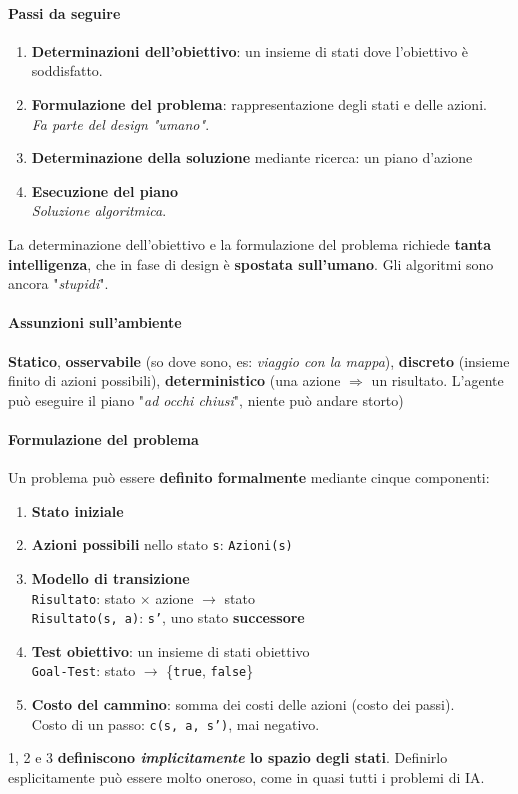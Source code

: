 \documentclass[10pt]{book}
\begin{document}
\paragraph{Passi da seguire}
\begin{enumerate}
	\item \textbf{Determinazioni dell'obiettivo}: un insieme di stati dove l'obiettivo è soddisfatto.
	\item \textbf{Formulazione del problema}: rappresentazione degli stati e delle azioni.\\
	\textit{Fa parte del design "umano"}.
	\item \textbf{Determinazione della soluzione} mediante ricerca: un piano d'azione
	\item \textbf{Esecuzione del piano}\\
	\textit{Soluzione algoritmica}.
\end{enumerate}
La determinazione dell'obiettivo e la formulazione del problema richiede \textbf{tanta intelligenza}, che in fase di design è \textbf{spostata sull'umano}. Gli algoritmi sono ancora "\textit{stupidi}".
\paragraph{Assunzioni sull'ambiente} \textbf{Statico}, \textbf{osservabile} (so dove sono, es: \textit{viaggio con la mappa}), \textbf{discreto} (insieme finito di azioni possibili), \textbf{deterministico} (una azione $\Rightarrow$ un risultato. L'agente può eseguire il piano "\textit{ad occhi chiusi}", niente può andare storto)
\paragraph{Formulazione del problema} Un problema può essere \textbf{definito formalmente} mediante cinque componenti:
\begin{enumerate}
	\item \textbf{Stato iniziale}
	\item \textbf{Azioni possibili} nello stato \texttt{s}: \texttt{Azioni(s)}
	\item \textbf{Modello di transizione}\\
	\texttt{Risultato}: stato $\times$ azione $\longrightarrow$ stato\\
	\texttt{Risultato(s, a)}: \texttt{s'}, uno stato \textbf{successore}
	\item \textbf{Test obiettivo}: un insieme di stati obiettivo\\
	\texttt{Goal-Test}: stato $\longrightarrow$ \{\texttt{true}, \texttt{false}\}
	\item \textbf{Costo del cammino}: somma dei costi delle azioni (costo dei passi).\\
	Costo di un passo: \texttt{c(s, a, s')}, mai negativo.
\end{enumerate}
1, 2 e 3 \textbf{definiscono \textit{implicitamente} lo spazio degli stati}. Definirlo esplicitamente può essere molto oneroso, come in quasi tutti i problemi di IA.
\pagebreak
\end{document}
